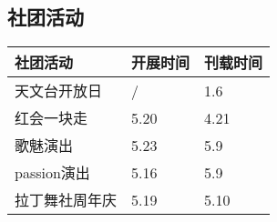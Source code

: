 \documentclass[letterpaper, 12pt]{article}
\begin{document}
\begin{multicols}{2}
\section{社团活动}
\begin{tabular}{|>{\centering\arraybackslash}m{}|m{}|m{}|}
    \hline
    社团活动 & 开展时间 & 刊载时间\\
    \hline\hline
    天文台开放日 & / & 1.6\\
    红会一块走 & 5.20 & 4.21\\
    歌魅演出 & 5.23 & 5.9\\
    passion演出 & 5.16 & 5.9\\
    拉丁舞社周年庆 & 5.19 & 5.10\\
    \hline
\end{tabular}

\end{multicols}
\end{document}
